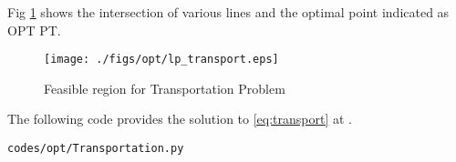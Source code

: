 \begin{enumerate}[label=\arabic*.,ref=\thesection.\theenumi]
Fig  \ref{fig:transport}
shows the intersection of various lines and the optimal point indicated as OPT PT.
\begin{figure}[h]
\texttt{[image: ./figs/opt/lp\_transport.eps]}
\caption{Feasible region for Transportation Problem}
\caption{}
\label{fig:transport}
\end{figure}

The following code provides the solution to \eqref{eq:transport} at .
%
\begin{lstlisting}
codes/opt/Transportation.py
\end{lstlisting}





\end{enumerate}
%    
    
